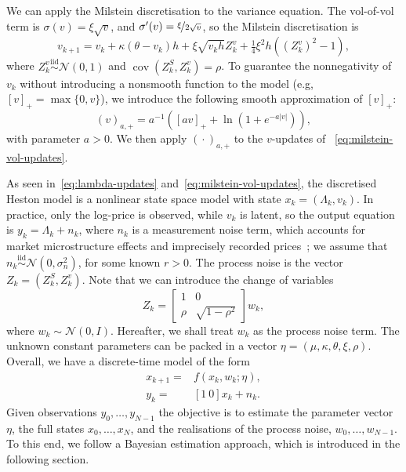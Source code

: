 \documentclass[11pt]{report}
\begin{document}
We can apply the Milstein discretisation to the variance equation. 
The vol-of-vol term is $\sigma(v) = \xi\sqrt{v}$, and 
$\sigma'(v) = \nicefrac{\xi}{2\sqrt{v}}$, 
so the Milstein discretisation is 
\begin{equation}
    v_{k+1} 
{}={} 
    v_k
    + \kappa(\theta - v_k)h 
    + \xi \sqrt{v_k h}Z_k^v 
    + \tfrac{1}{4}\xi^2 h((Z_k^v)^2 - 1),
    \label{eq:milstein-vol-updates}
\end{equation}
where $Z_k^v \overset{\text{iid}}{\sim} \mathcal{N}(0, 1)$
and $\operatorname{cov}(Z_k^S, Z_k^v) = \rho$.
To guarantee the nonnegativity of $v_k$ without introducing a nonsmooth 
function to the model (e.g, $[v]_+ = \max\{0, v\}$), we introduce the 
following smooth approximation of $[v]_+$:
\begin{equation}
    (v)_{a, +} = a^{-1} \left( [av]_+ + \ln\left(1 + e^{-a|v|}\right) \right),
\end{equation}
with parameter $a > 0$.
We then apply $({}\cdot{})_{a, +}$ to the  $v$-updates of 
~\eqref{eq:milstein-vol-updates}.



As seen in~\eqref{eq:lambda-updates} and~\eqref{eq:milstein-vol-updates},
the discretised Heston model is a nonlinear state space model with state 
$x_k = (\Lambda_k, v_k)$. 
In practice, only the log-price is observed, while $v_k$
is latent, so the output equation is $y_k = \Lambda_k + n_k$,
where $n_k$ is a measurement noise term, which accounts for market 
microstructure effects and imprecisely recorded prices~\cite{KanayaKristensen2015}; we assume that 
$n_k \overset{\text{iid}}{\sim} \mathcal{N}(0, \sigma_n^2)$, 
for some known $r>0$.
The process noise is the vector $Z_k = (Z_k^S, Z_k^v)$. 
Note that we can introduce the change of variables
\begin{equation}
    Z_k = \left[\begin{smallmatrix}
    1 & 0 \\ \rho & \sqrt{1 - \rho^2}
\end{smallmatrix}\right]w_k,
\end{equation}
where $w_k \sim \mathcal{N}(0, I)$.
Hereafter, we shall treat $w_k$ as the process noise term.
The unknown constant parameters can be packed in a vector 
$\eta=(\mu, \kappa, \theta, \xi, \rho)$.
Overall, we have a discrete-time model of the form
\begin{subequations}
    \begin{align}
        x_{k+1} {}={}& f(x_k, w_k; \eta),
        \label{eq:ss:x}
        \\
        y_k {}={}& [1 ~ 0]x_k + n_k.
        \label{eq:ss:y}
    \end{align}
\end{subequations}
Given observations $y_0, \ldots, y_{N-1}$
the objective is to estimate the parameter vector $\eta$, 
the full states $x_0, \ldots, x_{N}$, 
and the realisations of the process noise, $w_0, \ldots, w_{N-1}$.
To this end, we follow a Bayesian estimation approach,
which is introduced in the following section.
\end{document}

